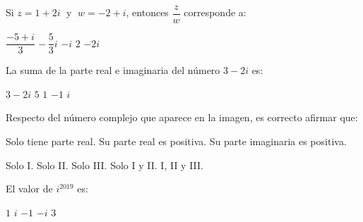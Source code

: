 \documentclass[]{srs}
\begin{document}
\begin{preguntas}[after-item-skip=2cm]


\pregunta  Si $z = 1+2i\;$ y $\; w=-2+i$, entonces $\dfrac{z}{w}$ corresponde a:\\
\begin{vertical}
  \alternativa $\dfrac{-5+i}{3}$
  \alternativa $-\,\dfrac{5}{3}i$
  \alternativa $-i$
  \alternativa $2$
  \alternativa $-2i$
\end{vertical}



 \pregunta La suma de la parte real e imaginaria del número $3-2i$ es:\\
 \begin{vertical}
 \alternativa $3-2i$
 \alternativa $5$
 \alternativa $1$
 \alternativa $-1$
 \alternativa $i$
 \end{vertical}


 \pregunta Respecto del número complejo que aparece en la imagen, es correcto
 afirmar que:\\
\begin{center}
\end{center}
\begin{vertical*}
  \alternativa Solo tiene parte real.
  \alternativa Su parte real es positiva.
  \alternativa Su parte imaginaria es positiva.
\end{vertical*}
\begin{vertical}
  \alternativa Solo I.
  \alternativa Solo II.
  \alternativa Solo III.
  \alternativa Solo I y II.
  \alternativa I, II y III.
\end{vertical}

\pregunta El valor de $i^{2019}$ es:\\
\begin{vertical}
\alternativa $1$
\alternativa $i$
\alternativa $-1$
\alternativa $-i$
\alternativa $3$
\end{vertical}


\end{preguntas}
\end{document}
